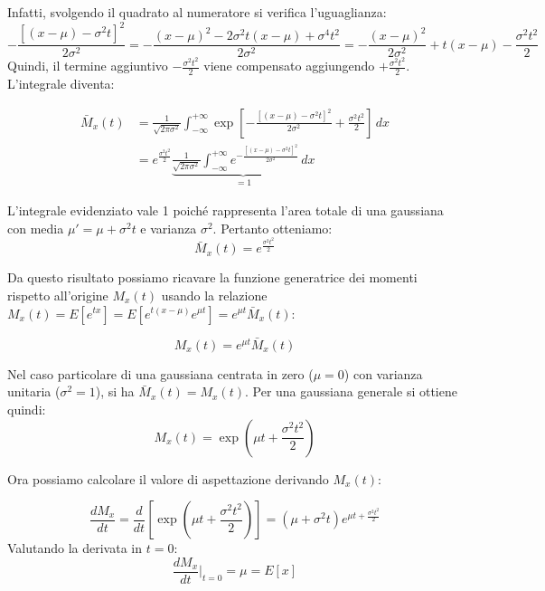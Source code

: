 \documentclass[openany,a4paper,12pt]{book}
\theoremstyle{remark}
\begin{document}
Infatti, svolgendo il quadrato al numeratore si verifica l'uguaglianza:
\begin{equation}
-\frac{\left[ (x-\mu) - \sigma^2 t \right]^2}{2\sigma^2} = -\frac{(x-\mu)^2 - 2 \sigma^2 t (x-\mu) + \sigma^4 t^2}{2\sigma^2} = -\frac{(x-\mu)^2}{2\sigma^2} + t(x-\mu) - \frac{\sigma^2 t^2}{2}
\end{equation}
Quindi, il termine aggiuntivo $-\frac{\sigma^2 t^2}{2}$ viene compensato aggiungendo $+\frac{\sigma^2 t^2}{2}$. L'integrale diventa:

\begin{equation}
\begin{aligned}
\bar{M}_x(t) &= \frac{1}{\sqrt{2\pi \sigma^2}} \int_{-\infty}^{+\infty}  \exp\left[ -\frac{\left[ (x-\mu) - \sigma^2 t \right]^2}{2\sigma^2} + \frac{\sigma^2 t^2}{2} \right] \, dx \\
&= e^{\frac{\sigma^2 t^2}{2}} \underbrace{\frac{1}{\sqrt{2\pi \sigma^2}} \int_{-\infty}^{+\infty} e^{-\frac{\left[ (x-\mu) - \sigma^2 t \right]^2}{2\sigma^2}} \, dx}_{=1}
\end{aligned}
\end{equation}

L'integrale evidenziato vale 1 poiché rappresenta l'area totale di una gaussiana con media $\mu' = \mu + \sigma^2 t$ e varianza $\sigma^2$. Pertanto otteniamo:
\begin{equation} \boxed{
\bar{M}_x(t) = e^{\frac{\sigma^2 t^2}{2}}}
\end{equation}

Da questo risultato possiamo ricavare la funzione generatrice dei momenti rispetto all'origine $M_x(t)$ usando la relazione $M_x(t) = E[e^{tx}] = E[e^{t(x-\mu)} e^{\mu t}] = e^{\mu t} \bar{M}_x(t)$:

\begin{equation}
M_x(t) = e^{\mu t} \bar{M}_x(t)
\end{equation}

Nel caso particolare di una gaussiana centrata in zero ($\mu=0$) con varianza unitaria ($\sigma^2=1$), si ha $\bar{M}_x(t)=M_x(t)$.
Per una gaussiana generale si ottiene quindi:
\begin{equation} \boxed{
M_x(t) = \exp\left(\mu t + \frac{\sigma^2 t^2}{2}\right)}
\end{equation}

Ora possiamo calcolare il valore di aspettazione derivando $M_x(t)$:

\begin{equation}
\frac{d M_x}{dt} = \frac{d}{dt} \left[ \exp\left( \mu t + \frac{\sigma^2 t^2}{2} \right) \right] = \left( \mu + \sigma^2 t \right) e^{\mu t + \frac{\sigma^2 t^2}{2}}
\end{equation}
Valutando la derivata in $t = 0$:
\begin{equation}
\frac{d M_x}{dt} \bigg\rvert_{t=0} = \mu = E[x] 
\end{equation}
\end{document}

